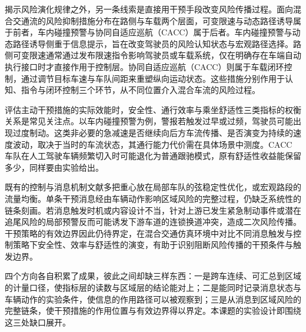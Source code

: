 \documentclass[oneside,doctype=proposal,fontset=windows,times=true]{tongjithesis}
\begin{document}
\begin{tjformbody}
%
揭示风险演化规律之外，另一条线索是直接用干预手段改变风险传播过程。面向混合交通流的风险抑制措施分布在路侧与车载两个层面，可变限速与动态路径诱导属于前者\cite{hegyi2010}\cite{khondaker2015}，车内碰撞预警与协同自适应巡航（CACC）属于后者\cite{ploeg2011}\cite{milanes2014}。车内碰撞预警与动态路径诱导侧重于信息提示，旨在改变驾驶员的风险认知状态与宏观路径选择。路侧可变限速通常通过发布限速指令影响驾驶员或车载系统，仅在明确存在车端自动执行接口时才直接作用于控制层。协同自适应巡航（CACC）则属于车载闭环控制，通过调节目标车速与车队间距来重塑纵向运动状态。这些措施分别作用于认知、指令与闭环控制三个环节，从不同位置介入混合车流的风险过程。

评估主动干预措施的实际效能时，安全性、通行效率与乘坐舒适性三类指标的权衡关系是常见关注点。以车内碰撞预警为例，警报若触发过早或过频，驾驶员可能出现过度制动\cite{khondaker2015}。这类非必要的急减速是否继续向后方车流传播、是否演变为持续的速度波动，取决于当时的车流状态，其通行能力代价需在具体场景中测度。CACC 车队在人工驾驶车辆频繁切入时可能退化为普通跟驰模式，原有舒适性收益能保留多少，同样要由实验给出。

既有的控制与消息机制文献多把重心放在局部车队的弦稳定性优化，或宏观路段的流量均衡。单条干预消息经由车辆动作影响区域风险的完整过程，仍缺乏系统性的链条刻画\cite{stern2018}\cite{coifman2026}。若消息触发时机或内容设计不当，针对上游已发生紧急制动事件或潜在追尾风险的局部预警反而可能诱发下游车道的连锁换道冲突，造成二次风险传播。干预策略的有效边界因此仍待界定，在混合交通仿真环境中对比不同消息触发与控制策略下安全性、效率与舒适性的演变，有助于识别阻断风险传播的干预条件与触发边界。

%
四个方向各自积累了成果，彼此之间却缺三样东西：一是跨车连续、可汇总到区域的计量口径，使指标层的读数与区域层的结论能对上；二是能同时记录消息状态与车辆动作的实验条件，使信息的作用路径可以被观察到；三是从消息到区域风险的完整链条，使干预措施的作用位置与有效边界得以界定。本课题的实验设计即围绕这三处缺口展开。
\end{tjformbody}
\end{document}
